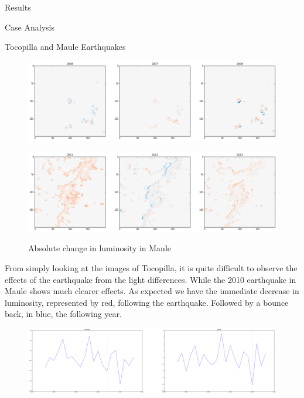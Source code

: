 \documentclass[12pt,fleqn,leqno,letterpaper]{article}
\begin{document}
\begin{section}{Results}
\begin{subsection}{Case Analysis}
\begin{subsubsection}{Tocopilla and Maule Earthquakes}
			\begin{figure}[H]
        \centering
				\includegraphics[width=1\linewidth]{tocopilla_series}\label{fig:tocopilla_series}
				\caption{Absolute change in luminosity in Tocopilla}
				\includegraphics[width=1\linewidth]{maule_series}\label{fig:maule_series}
				\caption{Absolute change in luminosity in Maule}
			\end{figure}
			From simply looking at the images of Tocopilla, it is quite difficult to observe the effects of the earthquake from the light differences. While the 2010 earthquake in Maule shows much clearer effects. As expected we have the immediate decrease in luminosity, represented by red, following the earthquake. Followed by a bounce back, in blue, the following year. \\
			\begin{figure}[H]
			\centering
				\includegraphics[width=1\linewidth]{maule_tocopilla}\label{fig:maule_tocopilla}
			\end{figure}

\end{subsubsection}
\end{subsection}
\end{section}
\end{document}
